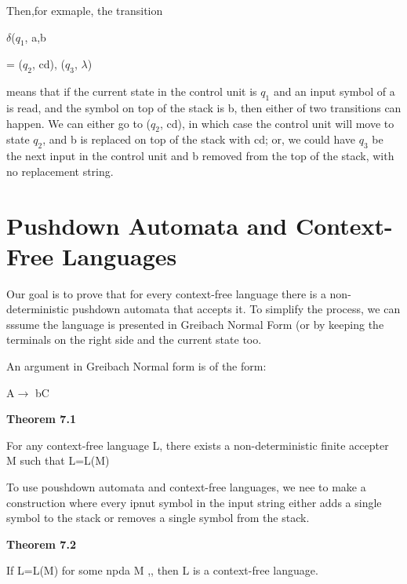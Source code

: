\documentclass{article}
\begin{document}
Then,for exmaple, the transition

\centerline{$\delta$($q_1$, a,b}= {($q_2$, cd), ($q_3$, $\lambda$)}

means that if the current state in the control unit is $q_1$ and an input symbol of a is read, and the symbol on top of the stack
is b, then either of two transitions can happen. We can either go to ($q_2$, cd), in which case the control unit will move to 
state $q_2$, and b is replaced on top of the stack with cd; or, we could have $q_3$ be the next input in the control unit and b
removed from the top of the stack, with no replacement string.
\section{Pushdown Automata and Context-Free Languages}
Our goal is to prove that for every context-free language there is a non-deterministic pushdown automata that
accepts it. To simplify the process, we can sssume the language is presented in Greibach Normal Form (or by 
keeping the terminals on the right side and the current state too.

An argument in Greibach Normal form is of the form:
\centerline{A$\rightarrow$ bC}
\centerline{\textbf{Theorem 7.1}}
For any context-free language L, there exists a non-deterministic finite accepter M such that
L=L(M)

To use poushdown automata and context-free languages, we nee to make a construction where every ipnut symbol in
the input string either adds a single symbol to the stack or removes a single symbol from the stack.
\centerline{\textbf{Theorem 7.2}}
If L=L(M) for some npda M ,, then L is a context-free language.
\end{document}
